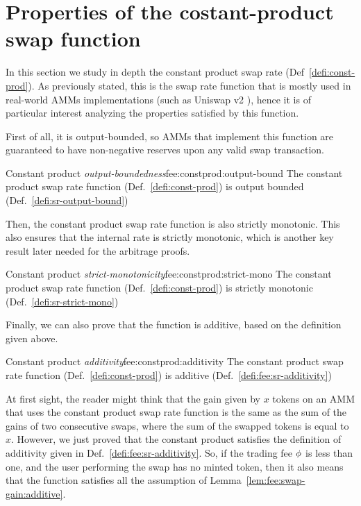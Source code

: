 \section{Properties of the costant-product swap function}
In this section we study in depth the constant product swap rate (Def~\ref{defi:const-prod}). As previously stated, this is the swap rate function that is mostly used in real-world AMMs implementations (such as Uniswap v2 \cite{uniswapimpl}), hence it is of particular interest analyzing the properties satisfied by this function. 

First of all, it is output-bounded, so AMMs that implement this function are guaranteed to have non-negative reserves upon any valid swap transaction. 

\begin{lemma}{Constant product \emph{output-boundedness}}{fee:constprod:output-bound}
    The constant product swap rate function (Def.~\ref{defi:const-prod}) is output bounded (Def.~\ref{defi:sr-output-bound})
\end{lemma}
Then, the constant product swap rate function is also strictly monotonic. This also ensures that the internal rate is strictly monotonic, which is another key result later needed for the arbitrage proofs.

\begin{lemma}{Constant product \emph{strict-monotonicity}}{fee:constprod:strict-mono}
    The constant product swap rate function (Def.~\ref{defi:const-prod}) is strictly monotonic (Def.~\ref{defi:sr-strict-mono})
\end{lemma}

Finally, we can also prove that the function is additive, based on the definition given above. 

\begin{lemma}{Constant product \emph{additivity}}{fee:constprod:additivity}
The constant product swap rate function (Def.~\ref{defi:const-prod}) is additive (Def.~\ref{defi:fee:sr-additivity})
\end{lemma}

At first sight, the reader might think that the gain given by $x$ tokens on an AMM that uses the constant product swap rate function is the same as the sum of the gains of two consecutive swaps, where the sum of the swapped tokens is equal to $x$. However, we just proved that the constant product satisfies the definition of additivity given in Def.~\ref{defi:fee:sr-additivity}. So, if the trading fee $\phi$ is less than one, and the user performing the swap has no minted token, then it also means that the function satisfies all the assumption of Lemma~\ref{lem:fee:swap-gain:additive}. 

